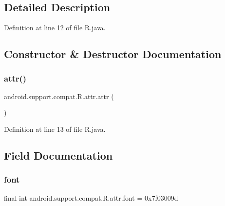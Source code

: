 \subsection{Detailed Description}


Definition at line 12 of file R.\+java.



\subsection{Constructor \& Destructor Documentation}
\mbox{\label{classandroid_1_1support_1_1compat_1_1_r_1_1attr_ab6d46d4f02cbae6e5d468914d3b096a5}} 
\subsubsection{\texorpdfstring{attr()}{attr()}}
{\footnotesize\ttfamily android.\+support.\+compat.\+R.\+attr.\+attr (\begin{DoxyParamCaption}{ }\end{DoxyParamCaption})\hspace{0.3cm}{\ttfamily [private]}}



Definition at line 13 of file R.\+java.


\begin{DoxyCode}{0}

\end{DoxyCode}


\subsection{Field Documentation}
\mbox{\label{classandroid_1_1support_1_1compat_1_1_r_1_1attr_a81787f6b5888bbbadbced1dcdf540898}} 
\subsubsection{\texorpdfstring{font}{font}}
{\footnotesize\ttfamily final int android.\+support.\+compat.\+R.\+attr.\+font = 0x7f03009d\hspace{0.3cm}{\ttfamily [static]}}



